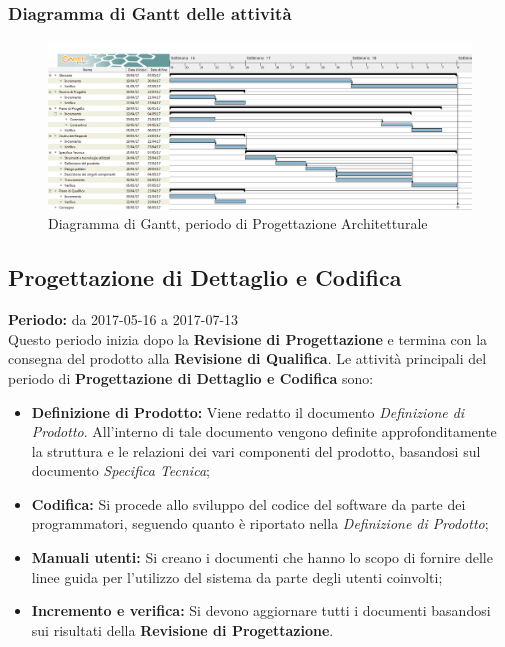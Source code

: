 	\subsubsection{Diagramma di Gantt delle attività}
	\begin{figure}[H]
		\centering
		\includegraphics[width=1\linewidth]{immagini/gantt/progettazione_architetturale.png}
		\caption{Diagramma di Gantt, periodo di Progettazione Architetturale}
	\end{figure}
	\subsection{Progettazione di Dettaglio e Codifica}
	\textbf{Periodo:} da 2017-05-16 a 2017-07-13 \\
	Questo periodo inizia dopo la \textbf{Revisione di Progettazione} e termina con la consegna del prodotto alla \textbf{Revisione di Qualifica}. Le attività principali del periodo di \textbf{Progettazione di Dettaglio e Codifica} sono: \\
	\begin{itemize}
		\item \textbf{Definizione di Prodotto:} Viene redatto il documento \textit{Definizione di Prodotto}. All'interno di tale documento vengono definite approfonditamente la struttura e le relazioni dei vari componenti del prodotto, basandosi sul documento \textit{Specifica Tecnica};
		\item \textbf{Codifica:} Si procede allo sviluppo del codice del software da parte dei programmatori, seguendo quanto è riportato nella \textit{Definizione di Prodotto};
		\item \textbf{Manuali utenti:} Si creano i documenti che hanno lo scopo di fornire delle linee guida per l'utilizzo del sistema da parte degli utenti coinvolti;
		\item \textbf{Incremento e verifica:} Si devono aggiornare tutti i documenti basandosi sui risultati della \textbf{Revisione di Progettazione}. \\
	\end{itemize}
